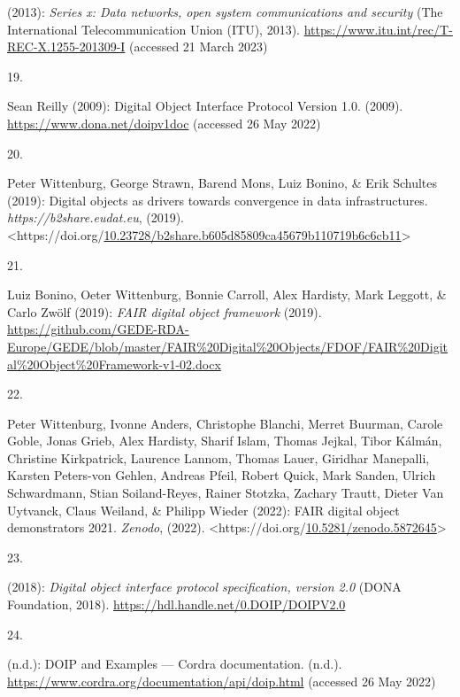 \begin{thebibliography}{9}
(2013): \emph{Series x: Data networks, open system communications and
security} ({The International Telecommunication Union (ITU)}, 2013).
\url{https://www.itu.int/rec/T-REC-X.1255-201309-I} (accessed 21 March
2023)

\hypertarget{ref-DigitalObjectInterface}{}
19.

Sean Reilly (2009): Digital {Object Interface Protocol Version} 1.0.
(2009). \url{https://www.dona.net/doipv1doc} (accessed 26 May 2022)

\hypertarget{ref-wittenburgDigitalObjectsDrivers2019a}{}
20.

Peter Wittenburg, George Strawn, Barend Mons, Luiz Bonino, \& Erik
Schultes (2019): Digital objects as drivers towards convergence in data
infrastructures. \emph{https://b2share.eudat.eu}, (2019).
\textless https://doi.org/\href{https://doi.org/10.23728/b2share.b605d85809ca45679b110719b6c6cb11}{10.23728/b2share.b605d85809ca45679b110719b6c6cb11}\textgreater{}

\hypertarget{ref-boninoFAIRDigitalObject}{}
21.

Luiz Bonino, Oeter Wittenburg, Bonnie Carroll, Alex Hardisty, Mark
Leggott, \& Carlo Zwölf (2019): \emph{{FAIR} digital object framework}
(2019).
\url{https://github.com/GEDE-RDA-Europe/GEDE/blob/master/FAIR\%20Digital\%20Objects/FDOF/FAIR\%20Digital\%20Object\%20Framework-v1-02.docx}

\hypertarget{ref-wittenburgFAIRDigitalObject2022b}{}
22.

Peter Wittenburg, Ivonne Anders, Christophe Blanchi, Merret Buurman,
Carole Goble, Jonas Grieb, Alex Hardisty, Sharif Islam, Thomas Jejkal,
Tibor Kálmán, Christine Kirkpatrick, Laurence Lannom, Thomas Lauer,
Giridhar Manepalli, Karsten Peters-von Gehlen, Andreas Pfeil, Robert
Quick, Mark Sanden, Ulrich Schwardmann, Stian Soiland-Reyes, Rainer
Stotzka, Zachary Trautt, Dieter Van Uytvanck, Claus Weiland, \& Philipp
Wieder (2022): {FAIR} digital object demonstrators 2021. \emph{Zenodo},
(2022).
\textless https://doi.org/\href{https://doi.org/10.5281/zenodo.5872645}{10.5281/zenodo.5872645}\textgreater{}

\hypertarget{ref-foundationDigitalObjectInterface}{}
23.

(2018): \emph{Digital object interface protocol specification, version
2.0} ({DONA Foundation}, 2018).
\url{https://hdl.handle.net/0.DOIP/DOIPV2.0}

\hypertarget{ref-DOIPExamplesCordraa}{}
24.

(n.d.): {DOIP} and {Examples} --- {Cordra} documentation. (n.d.).
\url{https://www.cordra.org/documentation/api/doip.html} (accessed 26
May 2022)


\end{thebibliography}
